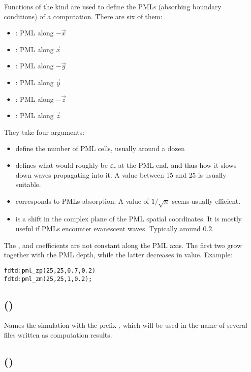 Functions of the  kind are used to define the PMLs (absorbing boundary conditions) of a computation. There are six of them:
\begin{itemize}
	\item {}: PML along $-\vec x$
	\item {}: PML along $\vec x$
	\item {}: PML along $-\vec y$
	\item {}: PML along $\vec y$
	\item {}: PML along $-\vec z$
	\item {}: PML along $\vec z$
\end{itemize}
They take four arguments:
\begin{itemize}
	\item {} define the number of PML cells, usually around a dozen
	\item {} defines what would roughly be $\varepsilon_r$ at the PML end, and thus how it slows down waves propagating into it. A value between 15 and 25 is usually suitable.
	\item {} corresponds to PMLs absorption. A value of $1/\sqrt{n}$ seems usually efficient.
	\item {} is a shift in the complex plane of the PML spatial coordinates. It is mostly useful if PMLs encounter evanescent waves. Typically around $0.2$.
\end{itemize}
The ,  and  coefficients are not constant along the PML axis. The first two grow together with the PML depth, while the latter decreases in value.
Example:

\begin{lstlisting}
fdtd:pml_zp(25,25,0.7,0.2)
fdtd:pml_zm(25,25,1,0.2);
\end{lstlisting}

\subsection[prefix]{()}

Names the simulation with the prefix , which will be used in the name of several files written as computation results.

\subsection[polarization]{()}

